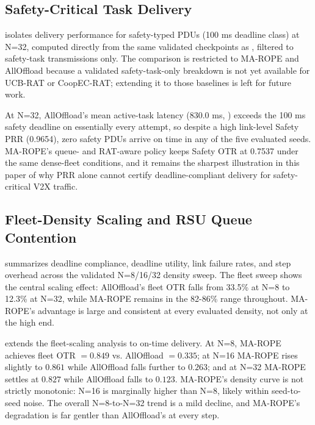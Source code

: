 





\subsection{Safety-Critical Task Delivery}

 isolates delivery performance for safety-typed PDUs (100 ms deadline class) at N=32, computed directly from the same validated checkpoints as , filtered to safety-task transmissions only. The comparison is restricted to MA-ROPE and AllOffload because a validated safety-task-only breakdown is not yet available for UCB-RAT or CoopEC-RAT; extending it to those baselines is left for future work.



At N=32, AllOffload's mean active-task latency (830.0 ms, ) exceeds the 100 ms safety deadline on essentially every attempt, so despite a high link-level Safety PRR (0.9654), zero safety PDUs arrive on time in any of the five evaluated seeds. MA-ROPE's queue- and RAT-aware policy keeps Safety OTR at 0.7537 under the same dense-fleet conditions, and it remains the sharpest illustration in this paper of why PRR alone cannot certify deadline-compliant delivery for safety-critical V2X traffic.

\subsection{Fleet-Density Scaling and RSU Queue Contention}

 summarizes deadline compliance, deadline utility, link failure rates, and step overhead across the validated N=8/16/32 density sweep. The fleet sweep shows the central scaling effect: AllOffload's fleet OTR falls from 33.5\% at N=8 to 12.3\% at N=32, while MA-ROPE remains in the 82-86\% range throughout. MA-ROPE's advantage is large and consistent at every evaluated density, not only at the high end.







 extends the fleet-scaling analysis to on-time delivery. At N=8, MA-ROPE achieves fleet OTR $=0.849$ vs. AllOffload $=0.335$; at N=16 MA-ROPE rises slightly to $0.861$ while AllOffload falls further to $0.263$; and at N=32 MA-ROPE settles at $0.827$ while AllOffload falls to $0.123$. MA-ROPE's density curve is not strictly monotonic: N=16 is marginally higher than N=8, likely within seed-to-seed noise. The overall N=8-to-N=32 trend is a mild decline, and MA-ROPE's degradation is far gentler than AllOffload's at every step.

